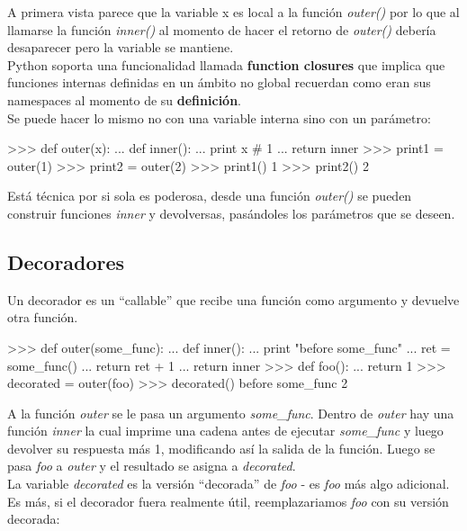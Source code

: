 A primera vista parece que la variable x es local a la función \textit{outer()} por lo que al llamarse la función \textit{inner()} al momento de hacer el retorno de \textit{outer()} debería desaparecer pero la variable se mantiene.\\

Python soporta una funcionalidad llamada \textbf{function closures} que implica que funciones internas definidas en un ámbito no global recuerdan como eran sus namespaces al momento de su \textbf{definición}.\\

Se puede hacer lo mismo no con una variable interna sino con un parámetro:\\

\begin{pyglist} [language=python]
>>> def outer(x):
...     def inner():
...         print x # 1
...     return inner
>>> print1 = outer(1)
>>> print2 = outer(2)
>>> print1()
1
>>> print2()
2
\end{pyglist}

Está técnica por si sola es poderosa, desde una función \textit{outer()} se pueden construir funciones \textit{inner} y devolversas, pasándoles los parámetros que se deseen.

\subsection{Decoradores}

Un decorador es un ``callable'' que recibe una función como argumento y devuelve otra función.

\begin{pyglist} [language=python]
>>> def outer(some_func):
...     def inner():
...         print "before some_func"
...         ret = some_func()
...         return ret + 1
...     return inner
>>> def foo():
...     return 1
>>> decorated = outer(foo) 
>>> decorated()
before some_func
2
\end{pyglist}

A la función \textit{outer} se le pasa un argumento \textit{some\_func}. Dentro de \textit{outer} hay una función \textit{inner} la cual imprime una cadena antes de ejecutar \textit{some\_func} y luego devolver su respuesta más 1, modificando así la salida de la función. Luego se pasa \textit{foo} a \textit{outer} y el resultado se asigna a \textit{decorated}.\\

La variable \textit{decorated} es la versión ``decorada'' de \textit{foo} - es \textit{foo} más algo adicional. Es más, si el decorador fuera realmente útil, reemplazariamos \textit{foo} con su versión decorada:\\

